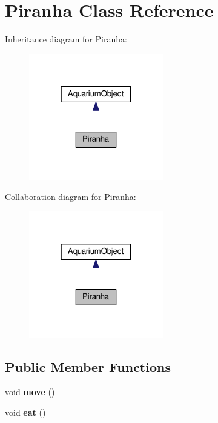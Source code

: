 \hypertarget{class_piranha}{}\section{Piranha Class Reference}
\label{class_piranha}


Inheritance diagram for Piranha\+:\nopagebreak
\begin{figure}[H]
\begin{center}
\leavevmode
\includegraphics[width=166pt]{class_piranha__inherit__graph}
\end{center}
\end{figure}


Collaboration diagram for Piranha\+:\nopagebreak
\begin{figure}[H]
\begin{center}
\leavevmode
\includegraphics[width=166pt]{class_piranha__coll__graph}
\end{center}
\end{figure}
\subsection*{Public Member Functions}
\begin{DoxyCompactItemize}
\item 
\mbox{\label{class_piranha_a6b86e73b3e5a57ee0fdb768c24ab9b67}} 
void {\bfseries move} ()
\item 
\mbox{\label{class_piranha_ac48c0256edd56c427b3d82f6e0d4df82}} 
void {\bfseries eat} ()
\end{DoxyCompactItemize}
